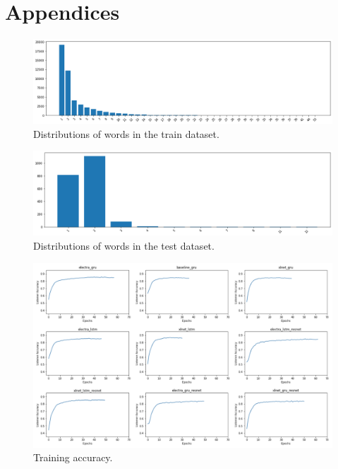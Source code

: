 \section{Appendices}
\label{sec:appendix}

\begin{figure}[htb!]
  \centering
  \includegraphics[width=1\textwidth]{assets/trainset_words.png}
  \caption[Train dataset words]{Distributions of words in the train dataset.}
  \label{figure:trainset-words}
\end{figure}

\begin{figure}[htb!]
  \centering
  \includegraphics[width=1\textwidth]{assets/testset_words.png}
  \caption[Test dataset words]{Distributions of words in the test dataset.}
  \label{figure:testset-words}
\end{figure}

\begin{figure}[htb!]
  \centering
  \includegraphics[width=1\textwidth]{assets/training_accuracy.png}
  \caption[Training Accuracy]{Training accuracy.}
  \label{figure:training-accuracy}
\end{figure}

